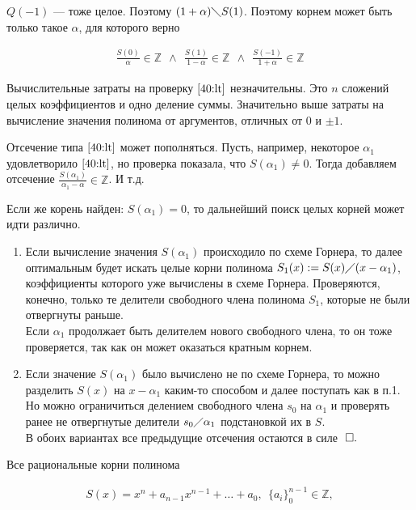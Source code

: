 \documentclass{article}
\begin{document}
$Q(-1)$ --- тоже целое. Поэтому $(1 + \alpha )\diagdown S(1)$. Поэтому корнем может быть только такое $\alpha $, для которого верно

\begin{align}
	\frac{S(0)}{\alpha }\in\mathbb{Z}~~\land ~~\frac{S(1)}{1-\alpha  }\in\mathbb{Z}~~\land ~~\frac{S(-1)}{1+\alpha }\in\mathbb{Z} \label{40:lt}
\end{align}

Вычислительные затраты на проверку $\eqref{40:lt}$ незначительны.
Это $n$ сложений целых коэффициентов и одно деление суммы. Значительно выше затраты на вычисление значения
полинома от аргументов, отличных от $0$ и $\pm 1$.

Отсечение типа $\eqref{40:lt}$ может пополняться. Пусть, например, некоторое $\alpha_1$ удовлетворило $\eqref{40:lt}$, но проверка показала, что $S(\alpha_1)\neq 0$. Тогда добавляем отсечение $\frac{S(\alpha_1)}{\alpha_1-\alpha }\in\mathbb{Z}$. И т.д.

Если же корень найден: $S(\alpha_1)=0$, то дальнейший поиск целых корней может идти различно.

\begin{enumerate}
	\item Если вычисление значения $S(\alpha_1)$ происходило по схеме Горнера, то далее оптимальным будет искать целые корни полинома $S_1(x):=S(x)\diagup (x-\alpha_1)$, коэффициенты которого уже вычислены в схеме Горнера.
	      Проверяются, конечно, только те делители свободного члена полинома $S_1$, которые не были отвергнуты раньше. \\
	      Если $\alpha_1$ продолжает быть делителем нового свободного
	      члена, то он тоже проверяется, так как он может оказаться кратным корнем.
	\item Если значение $S(\alpha_1)$ было вычислено не по схеме Горнера, то можно разделить $S(x)$ на $x-\alpha_1$ каким-то способом и далее поступать как в п.1. Но можно ограничиться
	      делением свободного члена $s_0$ на $\alpha_1$ и проверять ранее не отвергнутые делители $s_0\diagup\alpha_1$
	      подстановкой их в $S$. \\
	      В обоих вариантах все предыдущие отсечения остаются в силе $\qed$
\end{enumerate}

\theorem[6.36.]

Все рациональные корни полинома

\begin{align*}
	S(x)=x^n+a_{n-1}x^{n-1}+\ldots +a_0,~~\{a_i\}^{n-1}_0\in\mathbb{Z},
\end{align*}
\end{document}

